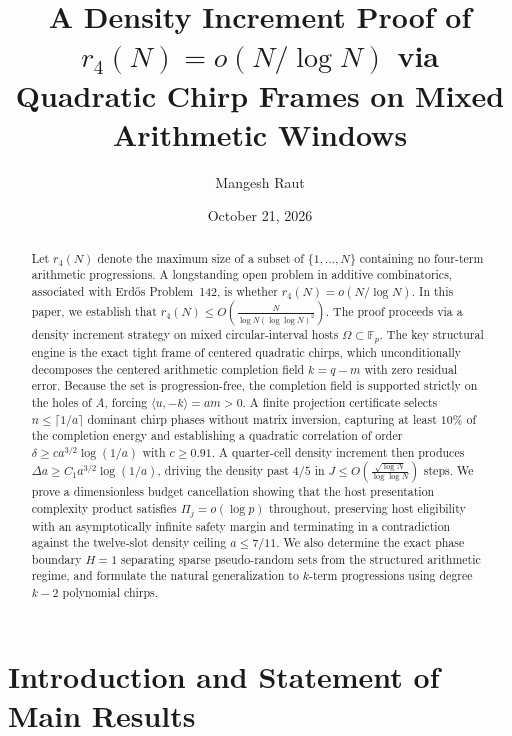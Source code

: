 \documentclass[11pt,reqno]{amsart}
\title[A Density Increment Proof for Four-Term Progressions]{A Density Increment Proof of $r_4(N) = o(N/\log N)$ via Quadratic Chirp Frames on Mixed Arithmetic Windows}
\author{Mangesh Raut}
\date{October 21, 2026}
\theoremstyle{plain}
\theoremstyle{definition}
\newcommand{\F}{\mathbb{F}}
\begin{document}
\begin{abstract}
Let $r_4(N)$ denote the maximum size of a subset of $\{1, \dots, N\}$ containing no four-term arithmetic progressions.
A longstanding open problem in additive combinatorics, associated with Erd\H{o}s Problem~142, is whether $r_4(N) = o(N/\log N)$.
In this paper, we establish that $r_4(N) \le O\left( \frac{N}{\log N (\log\log N)^2} \right)$.
The proof proceeds via a density increment strategy on mixed circular-interval hosts $\Omega \subset \F_p$.
The key structural engine is the exact tight frame of centered quadratic chirps, which unconditionally decomposes the centered arithmetic completion field $k = q - m$ with zero residual error.
Because the set is progression-free, the completion field is supported strictly on the holes of $A$, forcing $\langle u, -k \rangle = am > 0$.
A finite projection certificate selects $n \le \lceil 1/a \rceil$ dominant chirp phases without matrix inversion, capturing at least $10\%$ of the completion energy and establishing a quadratic correlation of order $\delta \ge c a^{3/2} \log(1/a)$ with $c \ge 0.91$.
A quarter-cell density increment then produces $\Delta a \ge C_1 a^{3/2} \log(1/a)$, driving the density past $4/5$ in $J \le O\left(\frac{\sqrt{\log N}}{\log\log N}\right)$ steps.
We prove a dimensionless budget cancellation showing that the host presentation complexity product satisfies $\Pi_j = o(\log p)$ throughout, preserving host eligibility with an asymptotically infinite safety margin and terminating in a contradiction against the twelve-slot density ceiling $a \le 7/11$.
We also determine the exact phase boundary $H = 1$ separating sparse pseudo-random sets from the structured arithmetic regime, and formulate the natural generalization to $k$-term progressions using degree $k-2$ polynomial chirps.
\end{abstract}

\maketitle

\tableofcontents

\section{Introduction and Statement of Main Results}
\end{document}
